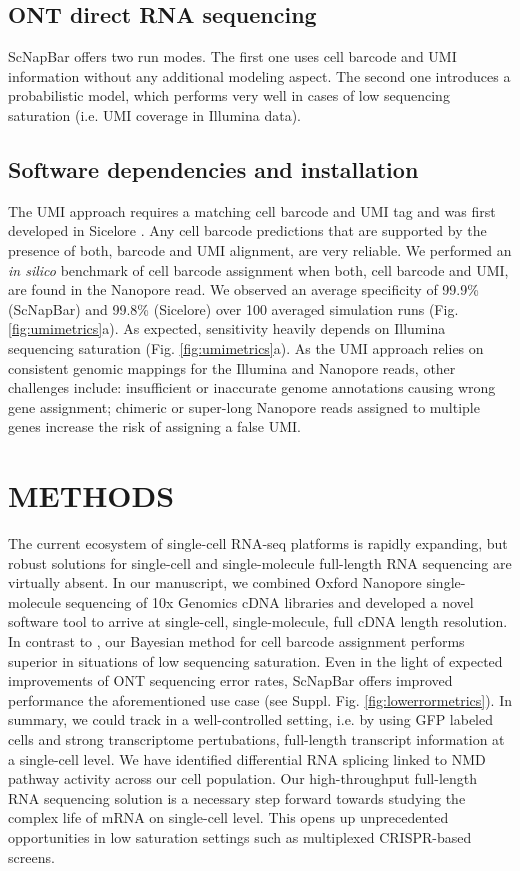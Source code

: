 \documentclass[times, 11pt, a4paper]{article}
\begin{document}
\subsection*{ONT direct RNA sequencing}
ScNapBar offers two run modes. The first one uses cell barcode and UMI information without any additional modeling aspect. The second one introduces a probabilistic model, which performs very well in cases of low sequencing saturation (i.e. UMI coverage in Illumina data).

\subsection*{Software dependencies and installation}
The UMI approach requires a matching cell barcode and UMI tag and was first developed in Sicelore . Any cell barcode predictions that are supported by the presence of both, barcode and UMI alignment, are very reliable. We performed an \emph{in silico} benchmark of cell barcode assignment when both, cell barcode and UMI,  are found in the Nanopore read. We observed an average specificity of 99.9\% (ScNapBar) and 99.8\% (Sicelore) over 100 averaged simulation runs (Fig. \ref{fig:umimetrics}a). As expected, sensitivity heavily depends on Illumina sequencing saturation (Fig. \ref{fig:umimetrics}a). As the UMI approach relies on consistent genomic mappings for the Illumina and Nanopore reads, other challenges include: insufficient or inaccurate genome annotations causing wrong gene assignment; chimeric or super-long Nanopore reads assigned to multiple genes increase the risk of assigning a false UMI. %

\section*{METHODS}
The current ecosystem of single-cell RNA-seq platforms is rapidly expanding, but robust solutions for single-cell and single-molecule full-length RNA sequencing are virtually absent. In our manuscript, we combined Oxford Nanopore single-molecule sequencing of 10x Genomics cDNA libraries and developed a novel software tool to arrive at single-cell, single-molecule, full cDNA length resolution. In contrast to , our Bayesian method for cell barcode assignment performs superior in situations of low sequencing saturation.
Even in the light of expected improvements of ONT sequencing error rates, ScNapBar offers improved performance the aforementioned use case (see Suppl. Fig. \ref{fig:lowerrormetrics}).  In summary, we could track in a well-controlled setting, i.e. by using GFP labeled cells and strong transcriptome pertubations, full-length transcript information at a single-cell level. We have identified differential RNA splicing linked to NMD pathway activity across our cell population. Our high-throughput full-length RNA sequencing solution is a necessary step forward towards studying the complex life of mRNA on single-cell level. This opens up unprecedented opportunities in low saturation settings such as multiplexed CRISPR-based screens.
\end{document}
